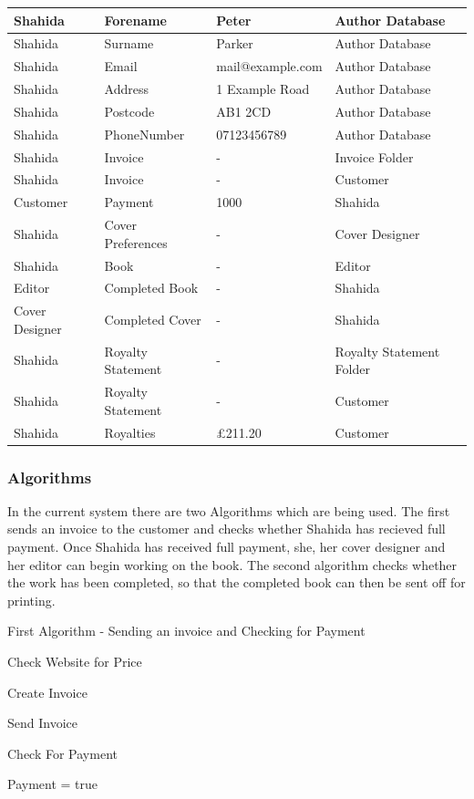 \begin{center}
\begin{tabular}{|p{3.5cm}|p{3.5cm}|p{3cm}|p{3cm}|}
    Shahida & Forename & Peter & Author Database  \\ \hline
    Shahida & Surname & Parker & Author Database  \\ \hline
    Shahida & Email & mail@example.com & Author Database  \\ \hline
    Shahida & Address & 1 Example Road & Author Database  \\ \hline
    Shahida & Postcode & AB1 2CD & Author Database  \\ \hline
    Shahida & PhoneNumber & 07123456789 & Author Database  \\ \hline
    Shahida & Invoice & - & Invoice Folder \\ \hline
    Shahida & Invoice & - & Customer  \\ \hline
    Customer & Payment & 1000 & Shahida  \\ \hline
    Shahida & Cover Preferences & - & Cover Designer\\ \hline
    Shahida & Book & - & Editor  \\ \hline
    Editor & Completed Book & - & Shahida  \\ \hline
    Cover Designer & Completed Cover & - & Shahida \\ \hline
    Shahida & Royalty Statement & - & Royalty Statement Folder \\ \hline
    Shahida & Royalty Statement & - & Customer \\ \hline
    Shahida & Royalties & £211.20 & Customer \\ \hline 
    \hline
\end{tabular}
\end{center}


\subsubsection{Algorithms}
In the current system there are two Algorithms which are being used. The first sends an invoice to the customer and checks whether Shahida has recieved full payment. Once Shahida has received full payment, she, her cover designer and her editor can begin working on the book. The second algorithm checks whether the work has been completed, so that the completed book can then be sent off for printing. 

\begin{algorithm}[H]
    \caption{First Algorithm - Sending an invoice and Checking for Payment}
\begin{algorithmic}[1]

\State

Check Website for Price

Create Invoice

Send Invoice


     Check For Payment


     	Payment = true

     \EndIf
\EndWhile
\end{algorithmic}
\end{algorithm}


